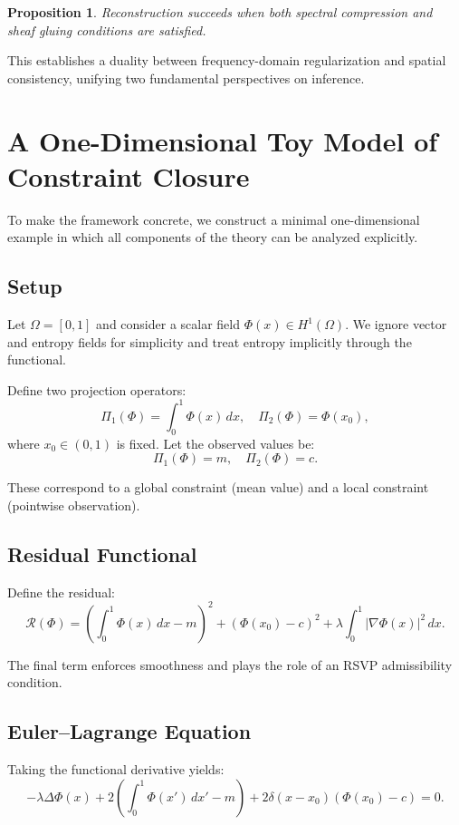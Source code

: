 \documentclass[12pt]{article}
\newtheorem{proposition}{Proposition}
\begin{document}
\begin{proposition}
Reconstruction succeeds when both spectral compression and sheaf gluing conditions are satisfied.
\end{proposition}

This establishes a duality between frequency-domain regularization and spatial consistency, unifying two fundamental perspectives on inference.

\section{A One-Dimensional Toy Model of Constraint Closure}

To make the framework concrete, we construct a minimal one-dimensional example in which all components of the theory can be analyzed explicitly.

\subsection{Setup}

Let $\Omega = [0,1]$ and consider a scalar field $\Phi(x) \in H^1(\Omega)$. We ignore vector and entropy fields for simplicity and treat entropy implicitly through the functional.

Define two projection operators:
\[
\Pi_1(\Phi) = \int_0^1 \Phi(x)\,dx, \quad
\Pi_2(\Phi) = \Phi(x_0),
\]
where $x_0 \in (0,1)$ is fixed. Let the observed values be:
\[
\Pi_1(\Phi) = m, \quad \Pi_2(\Phi) = c.
\]

These correspond to a global constraint (mean value) and a local constraint (pointwise observation).

\subsection{Residual Functional}

Define the residual:
\[
\mathcal{R}(\Phi) = 
\left(\int_0^1 \Phi(x)\,dx - m \right)^2
+ \left(\Phi(x_0) - c \right)^2
+ \lambda \int_0^1 |\nabla \Phi(x)|^2\, dx.
\]

The final term enforces smoothness and plays the role of an RSVP admissibility condition.

\subsection{Euler--Lagrange Equation}

Taking the functional derivative yields:
\[
- \lambda \Delta \Phi(x)
+ 2\!\left(\int_0^1 \Phi(x')\,dx' - m \right)
+ 2\delta(x-x_0)(\Phi(x_0) - c)
= 0.
\]
\end{document}
